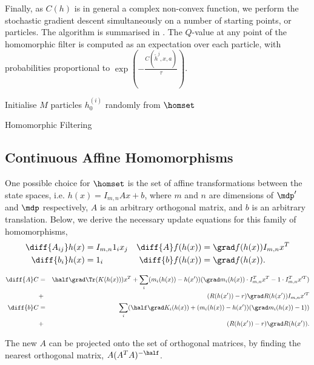 Finally, as $C(h)$ is in general a complex non-convex function, we
perform the stochastic gradient descent simultaneously on a number of
starting points, or particles. The algorithm is summarised in
. The $Q$-value at any point of the homomorphic
filter is computed as an expectation over each particle, with
probabilities proportional to $\exp(-\frac{C(\tilde{h}^j,x,a)}{\tau})$.

\begin{algorithm}[ht]
  \DontPrintSemicolon
  Initialise $M$ particles $h_0^{(i)}$ randomly from $\homset$ \;
  \caption{Homomorphic Filtering}
  \label{algo:homo-pf}
\end{algorithm}

\subsection{Continuous Affine Homomorphisms}
One possible choice for $\homset$ is the set of affine transformations
between the state spaces, i.e. $h(x) = I_{m,n} A x + b$, where $m$ and
$n$ are dimensions of $\mdp'$ and $\mdp$ respectively, $A$ is an
arbitrary orthogonal matrix, and $b$ is an arbitrary translation. Below,
we derive the necessary update equations for this family of
homomorphisms,
\begin{align*}
  \diff{A_{ij}} h(x) &= I_{m,n} 1_i x_j  & \diff{A} f(h(x)) &= \grad f(h(x)) I_{m,n} x^T  \\
  \diff{b_i} h(x) &= 1_i & \diff{b} f(h(x)) &= \grad f(h(x)).
\end{align*}

\begin{eqnarray*}
  \diff{A} C &=& \half \grad \Tr( K(h(x)) ) x^T + \sum_i (m_i(h(x)) - h(x')) (\grad m_i(h(x)) \cdot I_{m,n}^T x^T - 1 \cdot I_{m,n}^T x'^T) \\
             &+& (R(h(x')) - r) \grad R( h(x') ) I_{m,n} x'^T \\
  \diff{b} C &=& \sum_i ( \half \grad K_i(h(x)) + ( m_i(h(x)) - h(x')) (\grad m_i(h(x)) - 1) ) \\
             &+& (R(h(x')) - r) \grad R( h(x') ).
\end{eqnarray*}

The new $A$ can be projected onto the set of orthogonal matrices, by
finding the nearest orthogonal matrix, $A (A^T A)^{-\half}$.

